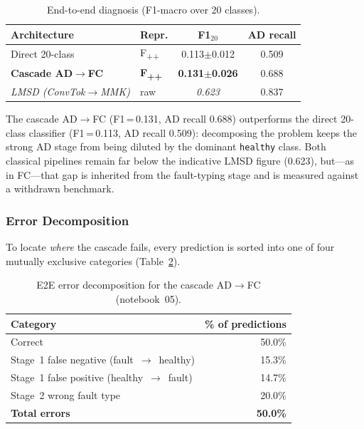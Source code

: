 \begin{table}[H]
    \centering
    \caption{End-to-end diagnosis (F1-macro over 20 classes).}
    \label{tab:e2e_results}
    \begin{tabular}{llcc}
        \toprule
        \textbf{Architecture} & \textbf{Repr.} & \textbf{F1$_{20}$} & \textbf{AD recall} \\
        \midrule
        Direct 20-class            & F\textsubscript{++} & 0.113$\pm$0.012 & 0.509 \\
        \textbf{Cascade AD$\to$FC} & \textbf{F\textsubscript{++}} & \textbf{0.131$\pm$0.026} & 0.688 \\
        \midrule
        \textit{LMSD (ConvTok$\to$MMK) \cite{lmsd2025}} & raw & \textit{0.623} & 0.837 \\
        \bottomrule
    \end{tabular}
\end{table}

The cascade AD$\to$FC (F1\,=\,0.131, AD recall 0.688) outperforms the direct
20-class classifier (F1\,=\,0.113, AD recall 0.509): decomposing the problem
keeps the strong AD stage from being diluted by the dominant \texttt{healthy}
class. Both classical pipelines remain far below the indicative LMSD figure
(0.623), but---as in FC---that gap is inherited from the fault-typing stage and
is measured against a withdrawn benchmark.

\subsubsection{Error Decomposition}

To locate \emph{where} the cascade fails, every prediction is sorted into one of
four mutually exclusive categories (Table~\ref{tab:error_decomp}).

\begin{table}[H]
    \centering
    \caption{E2E error decomposition for the cascade AD$\to$FC (notebook~05).}
    \label{tab:error_decomp}
    \begin{tabular}{lr}
        \toprule
        \textbf{Category} & \textbf{\% of predictions} \\
        \midrule
        Correct                                      & 50.0\% \\
        Stage~1 false negative (fault~$\to$~healthy) & 15.3\% \\
        Stage~1 false positive (healthy~$\to$~fault) & 14.7\% \\
        Stage~2 wrong fault type                     & 20.0\% \\
        \midrule
        \textbf{Total errors} & \textbf{50.0\%} \\
        \bottomrule
    \end{tabular}
\end{table}

